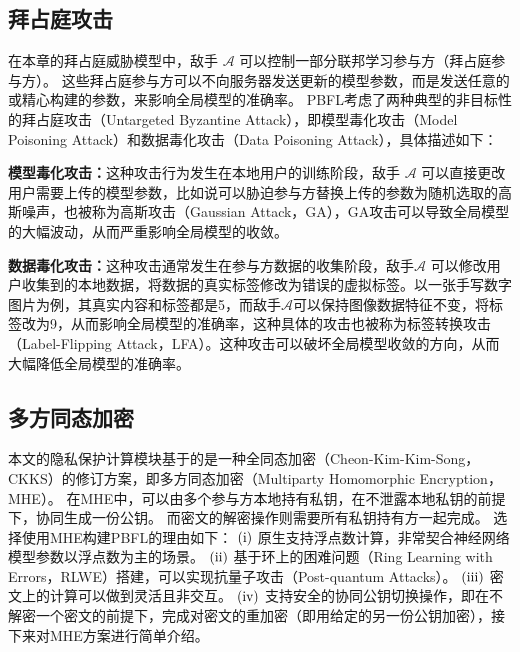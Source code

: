 \subsection{拜占庭攻击}
在本章的拜占庭威胁模型中，敌手 $\mathcal{A}$ 可以控制一部分联邦学习参与方（拜占庭参与方）。
这些拜占庭参与方可以不向服务器发送更新的模型参数，而是发送任意的或精心构建的参数，来影响全局模型的准确率。
PBFL考虑了两种典型的非目标性的拜占庭攻击（Untargeted Byzantine Attack），即模型毒化攻击（Model Poisoning Attack）和数据毒化攻击（Data Poisoning Attack），具体描述如下：
\begin{compactitem}
	\item \textbf{模型毒化攻击：}这种攻击行为发生在本地用户的训练阶段，敌手 $\mathcal{A}$ 可以直接更改用户需要上传的模型参数，比如说可以胁迫参与方替换上传的参数为随机选取的高斯噪声，也被称为高斯攻击（Gaussian Attack，GA）\cite{blanchard2017machine, dong2021flod}，GA攻击可以导致全局模型的大幅波动，从而严重影响全局模型的收敛。
	\item  \textbf{数据毒化攻击：}这种攻击通常发生在参与方数据的收集阶段，敌手$\mathcal{A}$ 可以修改用户收集到的本地数据，将数据的真实标签修改为错误的虚拟标签。以一张手写数字图片为例，其真实内容和标签都是5，而敌手$\mathcal{A}$可以保持图像数据特征不变，将标签改为9，从而影响全局模型的准确率，这种具体的攻击也被称为标签转换攻击（Label-Flipping Attack，LFA）\cite{kairouz2019advances, dong2021flod, liu2021privacy}。这种攻击可以破坏全局模型收敛的方向，从而大幅降低全局模型的准确率。
\end{compactitem}

\subsection{多方同态加密}
本文的隐私保护计算模块基于的是一种全同态加密（Cheon-Kim-Kim-Song，CKKS\cite{cheon2017homomorphic}）的修订方案，即多方同态加密（Multiparty Homomorphic Encryption，MHE\cite{mouchet2020multiparty}）。
在MHE中，可以由多个参与方本地持有私钥，在不泄露本地私钥的前提下，协同生成一份公钥。
而密文的解密操作则需要所有私钥持有方一起完成。
选择使用MHE构建PBFL的理由如下：
$(\rm \romannumeral1)$ 原生支持浮点数计算，非常契合神经网络模型参数以浮点数为主的场景。
$(\rm \romannumeral2)$ 基于环上的困难问题（Ring Learning with Errors，RLWE）搭建，可以实现抗量子攻击（Post-quantum Attacks）。
$(\rm \romannumeral3)$ 密文上的计算可以做到灵活且非交互。
$(\rm \romannumeral4)$ 支持安全的协同公钥切换操作，即在不解密一个密文的前提下，完成对密文的重加密（即用给定的另一份公钥加密），接下来对MHE方案进行简单介绍。


